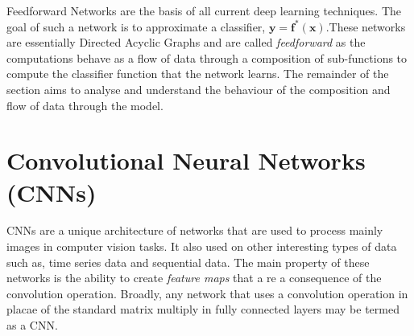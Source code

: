 Feedforward Networks are the basis of all current deep learning techniques. The goal of such a network is to approximate a classifier, $\bm{y}=\bm{f}^{*}(\bm{x})$.These networks are essentially Directed Acyclic Graphs and are called \textit{feedforward} as the computations behave as a flow of data through a composition of sub-functions to compute the classifier function that the network learns. The remainder of the section aims to analyse and understand the behaviour of the composition and flow of data through the model.\\


\section{Convolutional Neural Networks (CNNs)}

CNNs are a unique architecture of networks that are used to process mainly images in computer vision tasks. It also used on other interesting types of data such as, time series data and sequential data. The main property of these networks is the ability to create \textit{feature maps} that a re a consequence of the convolution operation. Broadly, any network that uses a convolution operation in placae of the standard matrix multiply in fully connected layers may be termed as a CNN.

